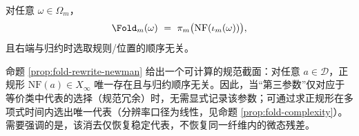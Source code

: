 \begin{corollary}\label{cor:foldm-order-indep}
对任意 $\omega\in\Omega_m$，
\[
\Fold_m(\omega)\ =\ \pi_m\bigl(\mathrm{NF}(\iota_m(\omega))\bigr),
\]
且右端与归约时选取规则/位置的顺序无关。
\end{corollary}

\begin{remark}[规范截面与可计算性]\label{rem:fold-normal-form-computable-section}
命题 \ref{prop:fold-rewrite-newman} 给出一个可计算的规范截面：对任意 $a\in\mathcal{D}$，正规形 $\mathrm{NF}(a)\in X_\infty$ 唯一存在且与归约顺序无关。因此，当“第三参数”仅对应于等价类中代表的选择（规范冗余）时，无需显式记录该参数；可通过求正规形在多项式时间内选出唯一代表（分辨率口径为线性，见命题 \ref{prop:fold-complexity}）。需要强调的是，该消去仅恢复稳定代表，不恢复同一纤维内的微态残差。
\end{remark}

